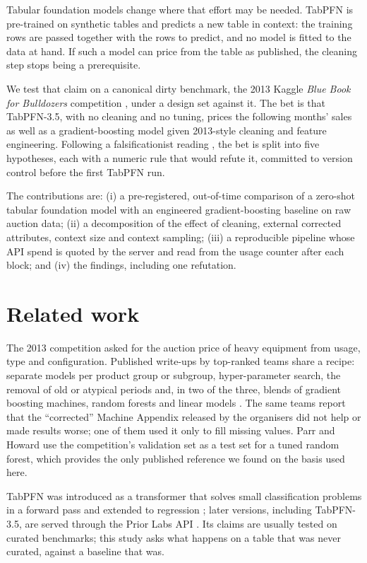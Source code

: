 \documentclass[11pt,a4paper]{article}
\begin{document}
Tabular foundation models change where that effort may be needed. TabPFN \cite{hollmann2023,hollmann2025} is pre-trained on synthetic tables and predicts a new table in context: the training rows are passed together with the rows to predict, and no model is fitted to the data at hand. If such a model can price from the table as published, the cleaning step stops being a prerequisite.

We test that claim on a canonical dirty benchmark, the 2013 Kaggle \emph{Blue Book for Bulldozers} competition \cite{kaggle2013}, under a design set against it. The bet is that TabPFN-3.5, with no cleaning and no tuning, prices the following months' sales as well as a gradient-boosting model \cite{friedman2001,ke2017} given 2013-style cleaning and feature engineering. Following a falsificationist reading \cite{popper1959}, the bet is split into five hypotheses, each with a numeric rule that would refute it, committed to version control before the first TabPFN run.

The contributions are: (i) a pre-registered, out-of-time comparison of a zero-shot tabular foundation model with an engineered gradient-boosting baseline on raw auction data; (ii) a decomposition of the effect of cleaning, external corrected attributes, context size and context sampling; (iii) a reproducible pipeline whose API spend is quoted by the server and read from the usage counter after each block; and (iv) the findings, including one refutation.

\section{Related work}

The 2013 competition asked for the auction price of heavy equipment from usage, type and configuration. Published write-ups by top-ranked teams share a recipe: separate models per product group or subgroup, hyper-parameter search, the removal of old or atypical periods and, in two of the three, blends of gradient boosting machines, random forests \cite{breiman2001} and linear models \cite{seroussi2014,olariu2013,dataiku2013}. The same teams report that the ``corrected'' Machine Appendix released by the organisers did not help or made results worse; one of them used it only to fill missing values. Parr and Howard \cite{parr} use the competition's validation set as a test set for a tuned random forest, which provides the only published reference we found on the basis used here.

TabPFN was introduced as a transformer that solves small classification problems in a forward pass \cite{hollmann2023} and extended to regression \cite{hollmann2025}; later versions, including TabPFN-3.5, are served through the Prior Labs API \cite{priorlabs}. Its claims are usually tested on curated benchmarks; this study asks what happens on a table that was never curated, against a baseline that was.
\end{document}
